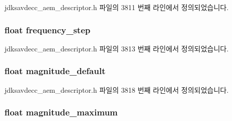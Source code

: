 jdksavdecc\+\_\+aem\+\_\+descriptor.\+h 파일의 3811 번째 라인에서 정의되었습니다.

\subsubsection[{\texorpdfstring{frequency\+\_\+step}{frequency_step}}]{\setlength{\rightskip}{0pt plus 5cm}float frequency\+\_\+step}\hypertarget{structjdksavdecc__values__bode__plot_ac6660c43196c54a294ec3f38667a2c54}{}\label{structjdksavdecc__values__bode__plot_ac6660c43196c54a294ec3f38667a2c54}


jdksavdecc\+\_\+aem\+\_\+descriptor.\+h 파일의 3813 번째 라인에서 정의되었습니다.

\subsubsection[{\texorpdfstring{magnitude\+\_\+default}{magnitude_default}}]{\setlength{\rightskip}{0pt plus 5cm}float magnitude\+\_\+default}\hypertarget{structjdksavdecc__values__bode__plot_afaf35eb351724eb0b20277d519ed7d38}{}\label{structjdksavdecc__values__bode__plot_afaf35eb351724eb0b20277d519ed7d38}


jdksavdecc\+\_\+aem\+\_\+descriptor.\+h 파일의 3818 번째 라인에서 정의되었습니다.

\subsubsection[{\texorpdfstring{magnitude\+\_\+maximum}{magnitude_maximum}}]{\setlength{\rightskip}{0pt plus 5cm}float magnitude\+\_\+maximum}\hypertarget{structjdksavdecc__values__bode__plot_ad232dbbda4bd135bc57d846cfe82c60f}{}\label{structjdksavdecc__values__bode__plot_ad232dbbda4bd135bc57d846cfe82c60f}



